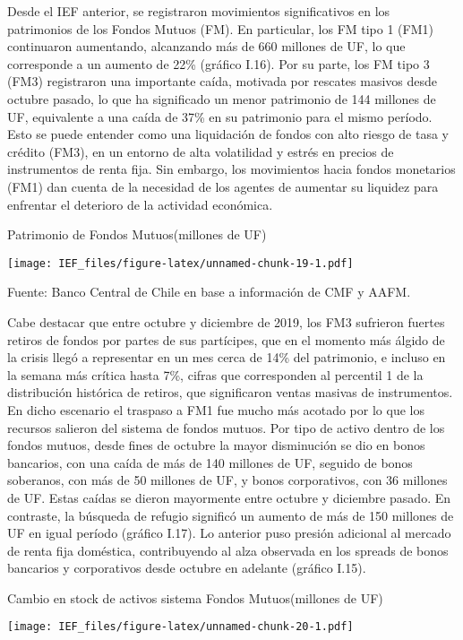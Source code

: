 \documentclass[
]{book}
\begin{document}
Desde el IEF anterior, se registraron movimientos significativos en los patrimonios
de los Fondos Mutuos (FM). En particular, los FM tipo 1 (FM1) continuaron
aumentando, alcanzando más de 660 millones de UF, lo que corresponde a un
aumento de 22\% (gráfico I.16). Por su parte, los FM tipo 3 (FM3) registraron
una importante caída, motivada por rescates masivos desde octubre pasado,
lo que ha significado un menor patrimonio de 144 millones de UF, equivalente
a una caída de 37\% en su patrimonio para el mismo período. Esto se puede
entender como una liquidación de fondos con alto riesgo de tasa y crédito
(FM3), en un entorno de alta volatilidad y estrés en precios de instrumentos de
renta fija. Sin embargo, los movimientos hacia fondos monetarios (FM1) dan
cuenta de la necesidad de los agentes de aumentar su liquidez para enfrentar
el deterioro de la actividad económica.

Patrimonio de Fondos Mutuos(millones de UF)

\texttt{[image: IEF\_files/figure-latex/unnamed-chunk-19-1.pdf]}

Fuente: Banco Central de Chile en base a información de CMF y AAFM.

Cabe destacar que entre octubre y diciembre de 2019, los FM3 sufrieron
fuertes retiros de fondos por partes de sus partícipes, que en el momento más
álgido de la crisis llegó a representar en un mes cerca de 14\% del patrimonio, e
incluso en la semana más crítica hasta 7\%, cifras que corresponden al percentil
1 de la distribución histórica de retiros, que significaron ventas masivas de
instrumentos. En dicho escenario el traspaso a FM1 fue mucho más acotado
por lo que los recursos salieron del sistema de fondos mutuos.
Por tipo de activo dentro de los fondos mutuos, desde fines de octubre
la mayor disminución se dio en bonos bancarios, con una caída de más de
140 millones de UF, seguido de bonos soberanos, con más de 50 millones
de UF, y bonos corporativos, con 36 millones de UF. Estas caídas se dieron
mayormente entre octubre y diciembre pasado. En contraste, la búsqueda de
refugio significó un aumento de más de 150 millones de UF en igual período
(gráfico I.17). Lo anterior puso presión adicional al mercado de renta fija
doméstica, contribuyendo al alza observada en los spreads de bonos bancarios
y corporativos desde octubre en adelante (gráfico I.15).

Cambio en stock de activos sistema Fondos Mutuos(millones de UF)

\texttt{[image: IEF\_files/figure-latex/unnamed-chunk-20-1.pdf]}
\end{document}

